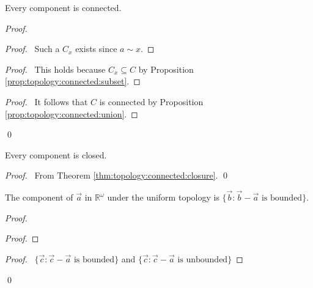 \begin{prop}[AC]
  \label{prop:topology:component:connected}
  Every component is connected.
\end{prop}

\begin{proof}
  \pf
  \begin{proof}
    \pf\ Such a $C_x$ exists since $a \sim x$.
  \end{proof}
  \begin{proof}
    \pf\ This holds because $C_x \subseteq C$ by Proposition
    \ref{prop:topology:connected:subset}.
  \end{proof}
  \qedstep
  \begin{proof}
    \pf\ It follows that $C$ is connected by Proposition
    \ref{prop:topology:connected:union}.
  \end{proof}
  \qed
\end{proof}

\begin{prop}
  \label{prop:topology:component:closed}
  Every component is closed.
\end{prop}

\begin{proof}
  \pf\ From Theorem \ref{thm:topology:connected:closure}. \qed
\end{proof}

 \begin{prop}
 The component of $\vec{a}$ in $\mathbb{R}^\omega$ under the uniform topology
 is $\{ \vec{b} : \vec{b} - \vec{a} \text{ is bounded} \}$.
\end{prop}

\begin{proof}
\pf
{}
\begin{proof}
\end{proof}
\begin{proof}
  \pf\ $\{ \vec{c} : \vec{c} - \vec{a} \text{ is bounded} \}$ and $\{ \vec{c}
  : \vec{c} - \vec{a} \text{ is unbounded} \}$
\end{proof}
\qed
\end{proof}

